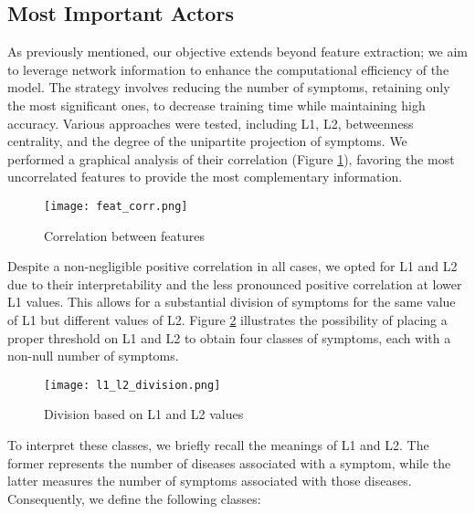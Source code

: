
\subsection{Most Important Actors}

As previously mentioned, our objective extends beyond feature extraction; we aim to leverage network information to 
enhance the computational efficiency of the model. The strategy involves reducing the number of symptoms, 
retaining only the most significant ones, to decrease training time while maintaining high accuracy. 
Various approaches were tested, including L1, L2, betweenness centrality, and the degree of the unipartite projection 
of symptoms. We performed a graphical analysis of their correlation (Figure \ref{fig:feat_corr}), favoring the 
most uncorrelated features to provide the most complementary information.

\begin{figure}[H]
    \centering
    \texttt{[image: feat\_corr.png]}
    \caption{Correlation between features}
    \label{fig:feat_corr}
\end{figure}

Despite a non-negligible positive correlation in all cases, we opted for L1 and L2 due to their interpretability and 
the less pronounced positive correlation at lower L1 values. This allows for a substantial division of symptoms for 
the same value of L1 but different values of L2. Figure \ref{fig:l1_l2_division} illustrates the possibility of 
placing a proper threshold on L1 and L2 to obtain four classes of symptoms, each with a non-null number of symptoms.

\begin{figure}[H]
    \centering
    \texttt{[image: l1\_l2\_division.png]}
    \caption{Division based on L1 and L2 values}
    \label{fig:l1_l2_division}
\end{figure}

To interpret these classes, we briefly recall the meanings of L1 and L2. The former represents the number of diseases 
associated with a symptom, while the latter measures the number of symptoms associated with those diseases. 
Consequently, we define the following classes:\\

